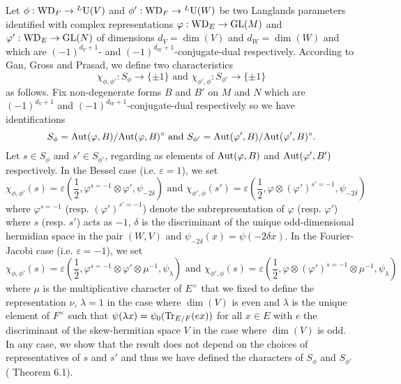 Let $\phi: \mathrm{WD}_F \to {}^L \mathrm{U}(V)$ and $\phi': \mathrm{WD}_F \to {}^L \mathrm{U}(W)$ be two Langlands parameters identified with complex representations $\varphi: \mathrm{WD}_E \to \mathrm{GL}(M)$ and $\varphi': \mathrm{WD}_E \to \mathrm{GL}(N)$ of dimensions $d_V = \dim(V)$ and $d_W = \dim(W)$ and which are $(-1)^{d_V + 1}$- and $(-1)^{d_W + 1}$-conjugate-dual respectively.
According to Gan, Gross and Prasad, we define two characteristics
\[
    \chi_{\phi, \phi'}: S_\phi \to \{ \pm 1\}\text{ and } \chi_{\phi', \phi}:S_{\phi'} \to \{\pm1\}
\]
as follows.
Fix non-degenerate forms $B$ and $B'$ on $M$ and $N$ which are $(-1)^{d_V + 1}$ and $(-1)^{d_W + 1}$-conjugate-dual respectively so we have identifications
\[
    S_\phi = \mathrm{Aut}(\varphi, B) / \mathrm{Aut}(\varphi, B)^\circ \text{ and } S_{\phi'} = \mathrm{Aut}(\varphi', B) / \mathrm{Aut}(\varphi', B)^\circ.
\]
Let $s \in S_\phi$ and $s' \in S_{\phi'}$, regarding as elements of $\mathrm{Aut}(\varphi, B)$ and $\mathrm{Aut}(\varphi', B')$ respectively.
In the Bessel case (i.e. $\varepsilon = 1$), we set
\[
    \chi_{\phi, \phi'}(s) = \varepsilon\left(\frac{1}{2}, \varphi^{s = -1} \otimes \varphi', \psi_{-2\delta}\right) \text{ and } \chi_{\phi', \phi}(s') = \varepsilon\left(\frac{1}{2}, \varphi \otimes (\varphi')^{s' = -1}, \psi_{-2\delta}\right)
\]
where $\varphi^{s=-1}$ (resp. $(\varphi')^{s' = -1}$) denote the subrepresentation of $\varphi$ (resp. $\varphi'$) where $s$ (resp. $s'$) acts as $-1$, $\delta$ is the discriminant of the unique odd-dimensional hermidian space in the pair $(W, V)$ and $\psi_{-2\delta}(x) = \psi(-2\delta x)$.
In the Fourier-Jacobi case (i.e. $\varepsilon = -1$), we set
\[
    \chi_{\phi, \phi'}(s) = \varepsilon\left(\frac{1}{2}, \varphi^{s = -1} \otimes \varphi' \otimes \mu^{-1}, \psi_\lambda\right) \text{ and } \chi_{\phi', \phi}(s) = \varepsilon\left(\frac{1}{2}, \varphi \otimes (\varphi')^{s=-1} \otimes \mu^{-1}, \psi_\lambda\right)
\]
where $\mu$ is the multiplicative character of $E^\times$ that we fixed to define the representation $\nu$, $\lambda = 1$ in the case where $\dim(V)$ is even and $\lambda$ is the unique element of $F^\times$ such that $\psi(\lambda x) = \psi_0(\mathrm{Tr}_{E/F}(ex))$ for all $x \in E$ with $e$ the discriminant of the skew-hermitian space $V$ in the case where $\dim(V)$ is odd.
In any case, we show that the result does not depend on the choices of representatives of $s$ and $s'$ and thus we have defined the characters of $S_\phi$ and $S_{\phi'}$ (\cite{gan2011symplectic} Theorem 6.1).


